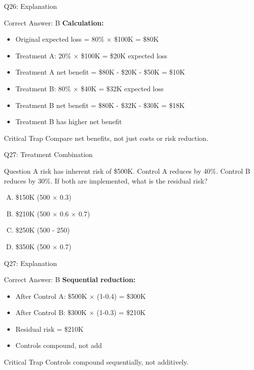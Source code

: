 \documentclass{beamer}
\begin{document}
			\begin{frame}{Q26: Explanation}
				\begin{block}{Correct Answer: B}
					\textbf{Calculation:}
					\begin{itemize}
						\item Original expected loss = 80\% $\times$ \$100K = \$80K
						\item Treatment A: 20\% $\times$ \$100K = \$20K expected loss
						\item Treatment A net benefit = \$80K - \$20K - \$50K = \$10K
						\item Treatment B: 80\% $\times$ \$40K = \$32K expected loss
						\item Treatment B net benefit = \$80K - \$32K - \$30K = \$18K
						\item Treatment B has higher net benefit
					\end{itemize}
				\end{block}
				\begin{alertblock}{Critical Trap}
					Compare net benefits, not just costs or risk reduction.
				\end{alertblock}
			\end{frame}
			
			\begin{frame}{Q27: Treatment Combination}
				\begin{block}{Question}
					A risk has inherent risk of \$500K. Control A reduces by 40\%. Control B reduces by 30\%. If both are implemented, what is the residual risk?
				\end{block}
				\begin{enumerate}[(A)]
					\item \$150K (500 $\times$ 0.3)
					\item \$210K (500 $\times$ 0.6 $\times$ 0.7)
					\item \$250K (500 - 250)
					\item \$350K (500 $\times$ 0.7)
				\end{enumerate}
			\end{frame}
			
			\begin{frame}{Q27: Explanation}
				\begin{block}{Correct Answer: B}
					\textbf{Sequential reduction:}
					\begin{itemize}
						\item After Control A: \$500K $\times$ (1-0.4) = \$300K
						\item After Control B: \$300K $\times$ (1-0.3) = \$210K
						\item Residual risk = \$210K
						\item Controls compound, not add
					\end{itemize}
				\end{block}
				\begin{alertblock}{Critical Trap}
					Controls compound sequentially, not additively.
				\end{alertblock}
			\end{frame}
			
\end{document}

